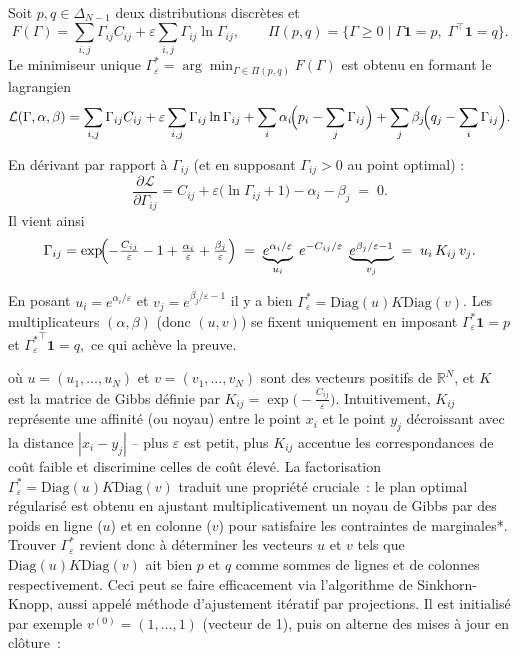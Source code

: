 \begin{demonstration}
Soit $p,q\in\Delta_{N-1}$ deux distributions discrètes et 
\[
F(\Gamma)
    =\sum_{i,j}\Gamma_{ij}C_{ij}
    +\varepsilon\sum_{i,j}\Gamma_{ij}\ln\Gamma_{ij},
    \qquad 
    \Pi(p,q)=\{\Gamma\ge0\mid\Gamma\mathbf 1=p,\;\Gamma^{\!\top}\mathbf 1=q\}.
\]
Le minimiseur unique $\Gamma^*_{\varepsilon}=\arg\min_{\Gamma\in\Pi(p,q)}F(\Gamma)$ est obtenu en formant le lagrangien
\[
\mathcal{L}(\Gamma,\alpha,\beta)
    =\sum_{i,j}\Gamma_{ij}C_{ij}
    +\varepsilon\sum_{i,j}\Gamma_{ij}\ln\Gamma_{ij}
    +\sum_{i}\alpha_i\!\Bigl(p_i-\sum_{j}\Gamma_{ij}\Bigr)
    +\sum_{j}\beta_j\!\Bigl(q_j-\sum_{i}\Gamma_{ij}\Bigr).
\]

\medskip
En dérivant par rapport à $\Gamma_{ij}$ (et en supposant $\Gamma_{ij}>0$ au point
optimal) :
\[
\frac{\partial\mathcal{L}}{\partial\Gamma_{ij}}
    =C_{ij}+\varepsilon\bigl(\ln\Gamma_{ij}+1\bigr)-\alpha_i-\beta_j
    \;=\;0.
\]
Il vient ainsi
\[
\Gamma_{ij}
    =\exp\!\Bigl(-\tfrac{C_{ij}}{\varepsilon}-1+\tfrac{\alpha_i}{\varepsilon}
                 +\tfrac{\beta_j}{\varepsilon}\Bigr)
    \;=\;
    \underbrace{e^{\alpha_i/\varepsilon}}_{u_i}
    \;e^{-C_{ij}/\varepsilon}\;
    \underbrace{e^{\beta_j/\varepsilon-1}}_{v_j}
    \;=\;u_i\,K_{ij}\,v_j.
\]

\medskip
En posant $u_i=e^{\alpha_i/\varepsilon}$ et
$v_j=e^{\beta_j/\varepsilon-1}$ il y a bien
$\Gamma^*_{\varepsilon}=\mathrm{Diag}(u)K\mathrm{Diag}(v)$.
Les multiplicateurs $(\alpha,\beta)$ (donc $(u,v)$) se fixent
uniquement en imposant
\(
\Gamma^*_{\varepsilon}\mathbf 1=p
\)
et
\(
{\Gamma^*_{\varepsilon}}^{\!\top}\mathbf 1=q,
\)
ce qui achève la preuve.
\end{demonstration}

où $u=(u_1,\dots,u_N)$ et $v=(v_1,\dots,v_N)$ sont des vecteurs positifs de $\mathbb{R}^N$, et $K$ est la matrice de Gibbs définie par $K_{ij}=\exp\big(-\frac{C_{ij}}{\varepsilon}\big)$. Intuitivement, $K_{ij}$ représente une affinité (ou noyau) entre le point $x_i$ et le point $y_j$ décroissant avec la distance $|x_i-y_j|$ – plus $\varepsilon$ est petit, plus $K_{ij}$ accentue les correspondances de coût faible et discrimine celles de coût élevé. La factorisation $\Gamma^*_{\varepsilon}= \mathrm{Diag}(u)K\mathrm{Diag}(v)$ traduit une propriété cruciale : le plan optimal régularisé est obtenu en ajustant multiplicativement un noyau de Gibbs par des poids en ligne ($u$) et en colonne ($v$) pour satisfaire les contraintes de marginales*. Trouver $\Gamma^*_{\varepsilon}$ revient donc à déterminer les vecteurs $u$ et $v$ tels que $\mathrm{Diag}(u)K\mathrm{Diag}(v)$ ait bien $p$ et $q$ comme sommes de lignes et de colonnes respectivement. Ceci peut se faire efficacement via l’algorithme de Sinkhorn-Knopp, aussi appelé méthode d’ajustement itératif par projections. Il est initialisé par exemple $v^{(0)} = (1,\dots,1)$ (vecteur de 1), puis on alterne des mises à jour en clôture :

